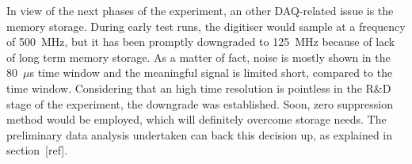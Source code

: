 In view of the next phases of the experiment, an other DAQ-related issue is the memory storage.
During early test runs, the digitiser would sample at a frequency of 500~MHz, but it has been %
promptly downgraded to 125~MHz because of lack of long term memory storage.
As a matter of fact, noise is mostly shown in the 80~$\mu$s time window and %
the meaningful signal is limited short, compared to the time window.
Considering that an high time resolution is pointless in the R\&D stage of the experiment, the %
downgrade was established.
Soon, zero suppression method would be employed, which will definitely overcome storage needs.
The preliminary data analysis undertaken can back this decision up, as explained in section~[ref].

